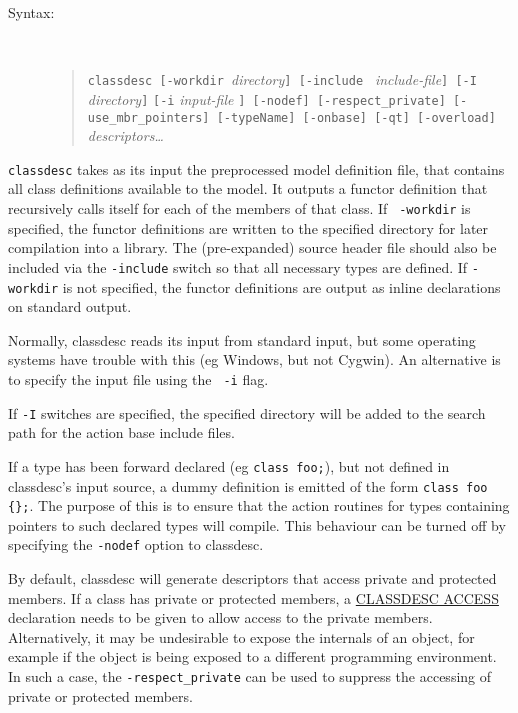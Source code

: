 
\begin{description}
\item[Syntax:]\mbox{}\\
\begin{quote}
{\tt classdesc [-workdir }{\em directory}{\tt ] [-include }{\em
  include-file}{\tt ] [-I} {\em directory}{\tt]} {\tt [-i} {\em
  input-file} {\tt] [-nodef]
  [-respect\_private] [-use\_mbr\_pointers] [-typeName] [-onbase] [-qt]
  [-overload]} {\em descriptors\ldots}
\end{quote}
\end{description}

{\tt classdesc} takes as its input the preprocessed model definition
file, that contains all class definitions available to the model. It
outputs a functor definition that recursively calls
itself for each of the members of that class. If {\tt
  -workdir} is specified, the functor definitions are
written to the specified directory for later compilation into a
library. The (pre-expanded) source header file should also be included
via the {\tt -include} switch so that all necessary
types are defined. If {\tt -workdir} is not specified, the functor
definitions are output as inline declarations on standard output.

Normally, classdesc reads its input from standard input, but some
operating systems have trouble with this (eg Windows, but not
Cygwin). An alternative is to specify the input file using the {\tt
  -i} flag.

If {\tt -I} switches are specified, the specified directory will be
added to the search path for the action base include files.

If a type has been forward declared (eg \verb+class foo;+), but not
defined in classdesc's input source, a dummy definition is emitted of
the form \verb+class foo {};+. The purpose of this is to ensure that
the action routines for types containing pointers to such declared
types will compile. This behaviour can be turned off by specifying the
\verb+-nodef+ option to classdesc.

By default, classdesc will generate descriptors that access private
and protected members. If a class has private or protected members, a
\hyperref{{\tt CLASSDESC\_ACCESS}}{ (see
  \S}{)}{CLASSDESC ACCESS} declaration needs
to be given to allow access to the private members. Alternatively, it
may be undesirable to expose the internals of an object, for example
if the object is being exposed to a different programming
environment. In such a case, the
\verb+-respect_private+ can be used to
suppress the accessing of private or protected members.



